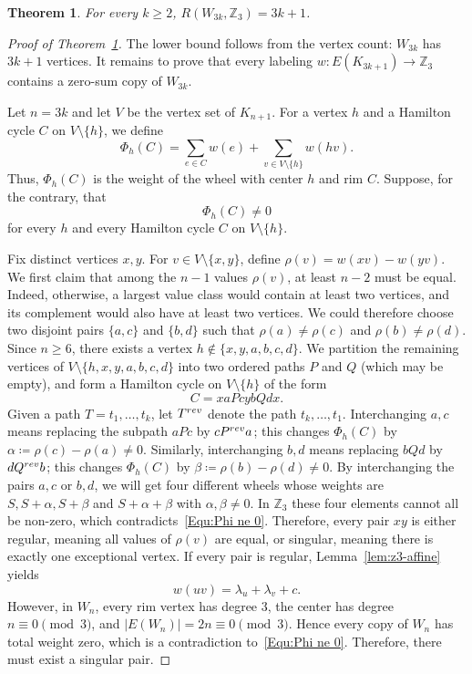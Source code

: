 \documentclass[10pt,a4paper]{amsart}
\newtheorem{theorem}{Theorem}
\newcommand{\Z}{\mathbb Z}
\begin{document}
\begin{theorem}\label{thm:q3-wheel}
    For every $k\ge 2$, $R(W_{3k},\Z_3)=3k+1$.
\end{theorem}

\begin{proof}[Proof of Theorem~\ref{thm:q3-wheel}]
    The lower bound follows from the vertex count: $W_{3k}$ has $3k+1$ vertices.
    It remains to prove that every labeling $w\colon E(K_{3k+1})\to\Z_3$ contains a zero-sum copy of $W_{3k}$.

    Let $n=3k$ and let $V$ be the vertex set of $K_{n+1}$.
    For a vertex $h$ and a Hamilton cycle $C$ on $V\setminus\{h\}$, we define
    \[
        \Phi_h(C)=\sum_{e\in C}w(e)+\sum_{v\in V\setminus\{h\}}w(hv).
    \]
    Thus, $\Phi_h(C)$ is the weight of the wheel with center $h$ and rim $C$.  Suppose, for the contrary, that
    \begin{equation}\label{Equ:Phi ne 0}
        \Phi_h(C)\ne0
    \end{equation}
    for every $h$ and every Hamilton cycle $C$ on $V\setminus\{h\}$.

    Fix distinct vertices $x,y$.
    For $v\in V\setminus\{x,y\}$, define $\rho(v)=w(xv)-w(yv)$.
    We first claim that among the $n-1$ values $\rho(v)$, at least $n-2$ must be equal.  Indeed, otherwise, a largest value class would contain at least two vertices, and its complement would also have at least two vertices.
    We could therefore choose two disjoint pairs $\{a,c\}$ and $\{b,d\}$ such that $\rho(a)\ne\rho(c)$ and $\rho(b)\ne\rho(d)$.
    Since $n\ge6$, there exists a vertex $h\notin\{x,y,a,b,c,d\}$.
    We partition the remaining vertices of $V\setminus\{h,x,y,a,b,c,d\}$ into two ordered paths $P$ and $Q$ (which may be empty), and form a Hamilton cycle on $V\setminus\{h\}$ of the form
    \[
        C=xaPcybQdx.
    \]
    Given a path $T=t_1,\ldots,t_k$, let $T^{\rm rev}$ denote the path $t_k,\ldots,t_1$.
    Interchanging $a,c$ means replacing the subpath $aPc$ by $cP^{\rm rev}a$; this changes $\Phi_h(C)$ by $\alpha\coloneqq\rho(c)-\rho(a)\ne0$.
    Similarly, interchanging $b,d$ means replacing $bQd$ by $dQ^{\rm rev}b$; this changes $\Phi_h(C)$ by $\beta\coloneqq\rho(b)-\rho(d)\ne0$.
    By interchanging the pairs $a,c$ or $b,d$, we will get four different wheels whose weights are $S,S+\alpha,S+\beta$ and $S+\alpha+\beta$ with $\alpha,\beta\ne0$.
    In $\Z_3$ these four elements cannot all be non-zero, which contradicts~\eqref{Equ:Phi ne 0}.
    Therefore, every pair $xy$ is either regular, meaning all values of $\rho(v)$ are equal, or singular, meaning there is exactly one exceptional vertex.
    If every pair is regular, Lemma~\ref{lem:z3-affine} yields
    \[
        w(uv)=\lambda_u+\lambda_v+c.
    \]
    However, in $W_n$, every rim vertex has degree $3$, the center has degree $n\equiv0\pmod3$, and $|E(W_n)|=2n\equiv0\pmod3$.
    Hence every copy of $W_n$ has total weight zero, which is a contradiction to~\eqref{Equ:Phi ne 0}.
    Therefore, there must exist a singular pair.


\end{proof}
\end{document}
